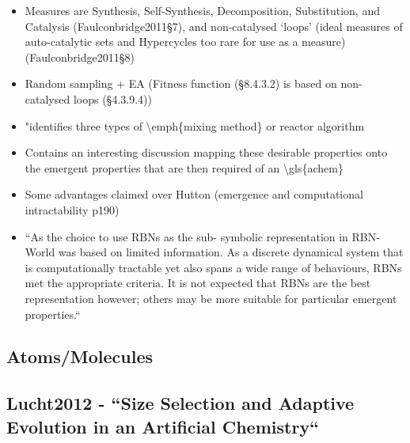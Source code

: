 \begin{itemize}
			\item
			
			Measures are Synthesis, Self-Synthesis, Decomposition, Substitution,
			and Catalysis (Faulconbridge2011§7), and non-catalysed `loops' (ideal
			measures of auto-catalytic sets and Hypercycles too rare for use as a
			measure) (Faulconbridge2011§8)
			
			\item
			
			Random sampling + EA (Fitness function (§8.4.3.2) is based on
			non-catalysed loops (§4.3.9.4))
			
			\item
			
			"identifies three types of \textbackslash{}emph\{mixing method\} or
			reactor algorithm
			
			\item
			
			Contains an interesting discussion mapping these desirable properties
			onto the emergent properties that are then required of an
			\textbackslash{}gls\{achem\}
			
			\item
			
			Some advantages claimed over Hutton (emergence and computational
			intractability p190)
			
			\item
			
			``As the choice to use RBNs as the sub- symbolic representation in
			RBN-World was based on limited information. As a discrete dynamical
			system that is computationally tractable yet also spans a wide range
			of behaviours, RBNs met the appropriate criteria. It is not expected
			that RBNs are the best representation however; others may be more
			suitable for particular emergent properties.``
			
		\end{itemize}
		
\subsection{Atoms/Molecules}
		
		\hypertarget{lucht2012---size-selection-and-adaptive-evolution-in-an-artificial-chemistry}{\subsection{Lucht2012
				- ``Size Selection and Adaptive Evolution in an Artificial
				Chemistry``}\label{lucht2012---size-selection-and-adaptive-evolution-in-an-artificial-chemistry}}
		
